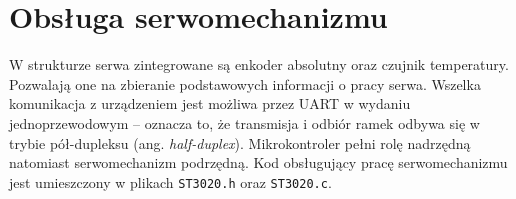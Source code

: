 \section{Obsługa serwomechanizmu}
W strukturze serwa zintegrowane są enkoder absolutny oraz czujnik temperatury. Pozwalają one na zbieranie podstawowych informacji o pracy serwa. Wszelka komunikacja z urządzeniem jest możliwa przez UART w wydaniu jednoprzewodowym -- oznacza to, że transmisja i odbiór ramek odbywa się w trybie pół-dupleksu (ang. \textit{half-duplex}). Mikrokontroler pełni rolę nadrzędną natomiast serwomechanizm podrzędną. Kod obsługujący pracę serwomechanizmu jest umieszczony w plikach \texttt{ST3020.h} oraz \texttt{ST3020.c}.

